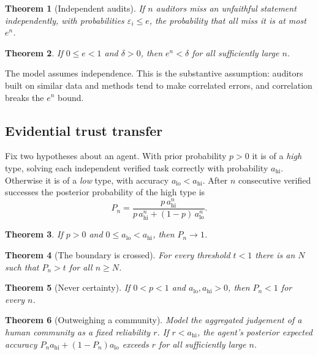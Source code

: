 \documentclass[11pt]{article}
\newtheorem{theorem}{Theorem}
\theoremstyle{definition}
\theoremstyle{remark}
\begin{document}
\begin{theorem}[Independent audits]
If $n$ auditors miss an unfaithful statement independently, with probabilities
$\varepsilon_i \le e$, the probability that all miss it is at most $e^n$.
\end{theorem}

\begin{theorem}
If $0 \le e < 1$ and $\delta > 0$, then $e^n < \delta$ for all sufficiently large $n$.
\end{theorem}

The model assumes independence. This is the substantive assumption: auditors built on similar
data and methods tend to make correlated errors, and correlation breaks the $e^n$ bound.

\subsection{Evidential trust transfer}

Fix two hypotheses about an agent. With prior probability $p>0$ it is of a \emph{high} type,
solving each independent verified task correctly with probability $a_{\mathrm{hi}}$. Otherwise
it is of a \emph{low} type, with accuracy $a_{\mathrm{lo}} < a_{\mathrm{hi}}$. After $n$
consecutive verified successes the posterior probability of the high type is
\[
P_n = \frac{p\,a_{\mathrm{hi}}^n}{p\,a_{\mathrm{hi}}^n + (1-p)\,a_{\mathrm{lo}}^n}.
\]

\begin{theorem}
If $p>0$ and $0 \le a_{\mathrm{lo}} < a_{\mathrm{hi}}$, then $P_n \to 1$.
\end{theorem}

\begin{theorem}[The boundary is crossed]
For every threshold $t < 1$ there is an $N$ such that $P_n > t$ for all $n \ge N$.
\end{theorem}

\begin{theorem}[Never certainty]
If $0 < p < 1$ and $a_{\mathrm{lo}}, a_{\mathrm{hi}} > 0$, then $P_n < 1$ for every $n$.
\end{theorem}

\begin{theorem}[Outweighing a community]
Model the aggregated judgement of a human community as a fixed reliability $r$. If
$r < a_{\mathrm{hi}}$, the agent's posterior expected accuracy
$P_n a_{\mathrm{hi}} + (1-P_n)a_{\mathrm{lo}}$ exceeds $r$ for all sufficiently large $n$.
\end{theorem}
\end{document}
